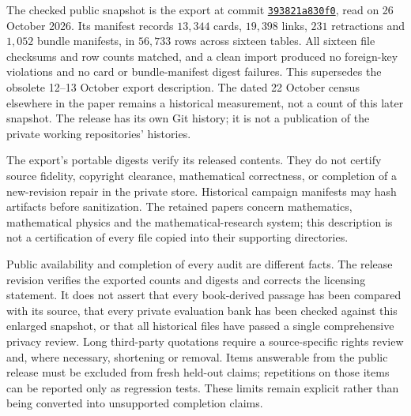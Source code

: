 The checked public snapshot is the export at commit \href{https://github.com/yspennstate/math-brain-public/commit/393821a830f0979d27c38430130900ac57fb1701}{\texttt{393821a830f0}}, read on 26 October 2026. Its manifest records $13{,}344$ cards, $19{,}398$ links, $231$ retractions and $1{,}052$ bundle manifests, in $56{,}733$ rows across sixteen tables. All sixteen file checksums and row counts matched, and a clean import produced no foreign-key violations and no card or bundle-manifest digest failures. This supersedes the obsolete 12--13 October export description. The dated 22 October census elsewhere in the paper remains a historical measurement, not a count of this later snapshot. The release has its own Git history; it is not a publication of the private working repositories' histories.

The export's portable digests verify its released contents. They do not certify source fidelity, copyright clearance, mathematical correctness, or completion of a new-revision repair in the private store. Historical campaign manifests may hash artifacts before sanitization. The retained papers concern mathematics, mathematical physics and the mathematical-research system; this description is not a certification of every file copied into their supporting directories.

Public availability and completion of every audit are different facts. The release revision verifies the exported counts and digests and corrects the licensing statement. It does not assert that every book-derived passage has been compared with its source, that every private evaluation bank has been checked against this enlarged snapshot, or that all historical files have passed a single comprehensive privacy review. Long third-party quotations require a source-specific rights review and, where necessary, shortening or removal. Items answerable from the public release must be excluded from fresh held-out claims; repetitions on those items can be reported only as regression tests. These limits remain explicit rather than being converted into unsupported completion claims.

